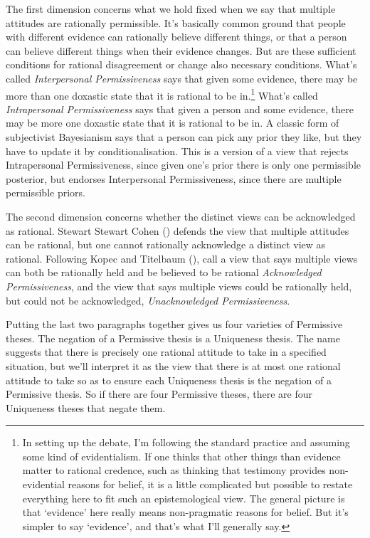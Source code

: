 \documentclass[
  12pt,
  letterpaper,
  DIV=11,
  numbers=noendperiod]{scrreprt}
\begin{document}
The first dimension concerns what we hold fixed when we say that
multiple attitudes are rationally permissible. It's basically common
ground that people with different evidence can rationally believe
different things, or that a person can believe different things when
their evidence changes. But are these sufficient conditions for rational
disagreement or change also necessary conditions. What's called
\emph{Interpersonal Permissiveness} says that given some evidence, there
may be more than one doxastic state that it is rational to be
in.\footnote{In setting up the debate, I'm following the standard
  practice and assuming some kind of evidentialism. If one thinks that
  other things than evidence matter to rational credence, such as
  thinking that testimony provides non-evidential reasons for belief, it
  is a little complicated but possible to restate everything here to fit
  such an epistemological view. The general picture is that `evidence'
  here really means non-pragmatic reasons for belief. But it's simpler
  to say `evidence', and that's what I'll generally say.} What's called
\emph{Intrapersonal Permissiveness} says that given a person and some
evidence, there may be more one doxastic state that it is rational to be
in. A classic form of subjectivist Bayesianism says that a person can
pick any prior they like, but they have to update it by
conditionalisation. This is a version of a view that rejects
Intrapersonal Permissiveness, since given one's prior there is only one
permissible posterior, but endorses Interpersonal Permissiveness, since
there are multiple permissible priors.

The second dimension concerns whether the distinct views can be
acknowledged as rational. Stewart Stewart Cohen
() defends the view that multiple
attitudes can be rational, but one cannot rationally acknowledge a
distinct view as rational. Following Kopec and Titelbaum
(), call a view that says
multiple views can both be rationally held and be believed to be
rational \emph{Acknowledged Permissiveness}, and the view that says
multiple views could be rationally held, but could not be acknowledged,
\emph{Unacknowledged Permissiveness}.

Putting the last two paragraphs together gives us four varieties of
Permissive theses. The negation of a Permissive thesis is a Uniqueness
thesis. The name suggests that there is precisely one rational attitude
to take in a specified situation, but we'll interpret it as the view
that there is at most one rational attitude to take so as to ensure each
Uniqueness thesis is the negation of a Permissive thesis. So if there
are four Permissive theses, there are four Uniqueness theses that negate
them.
\end{document}

